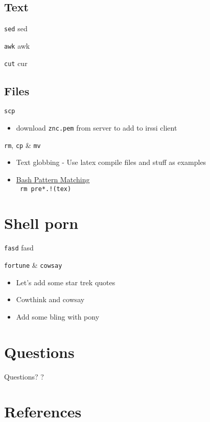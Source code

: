 \documentclass[11pt]{beamer}
\begin{document}
		\subsection{Text}
			\begin{frame}{ \texttt{sed}}
				sed
			\end{frame}
			\begin{frame}{ \texttt{awk}}
				awk
			\end{frame}
			\begin{frame}{ \texttt{cut}}
				cur
			\end{frame}
		\subsection{Files}
			\begin{frame}{ \texttt{scp}}
				\begin{itemize}
					\item download \texttt{znc.pem} from server to add to irssi client
				\end{itemize}			
			\end{frame}
			\begin{frame}{ \texttt{rm}, \texttt{cp} \& \texttt{mv}}
				\begin{itemize}
					\item Text globbing - Use latex compile files and stuff as examples
					\item \href{https://www.gnu.org/software/bash/manual/bashref.html#Pattern-Matching}{Bash Pattern Matching} \\
						\texttt{ rm pre*.!(tex) }
				\end{itemize}	
			\end{frame}

	\section{Shell porn}
		\begin{frame}{\texttt{fasd}}
			fasd
		\end{frame}
		\begin{frame}{\texttt{fortune} \& \texttt{cowsay}}
			\begin{itemize}
				\item Let's add some star trek quotes
				\item Cowthink and cowsay
				\item Add some bling with pony
			\end{itemize}
		\end{frame}

	\section{Questions}
		\begin{frame}{Questions?}
			\large ?
		\end{frame}

	\section*{References}
		\begin{frame}{References}
			\texttt{\}
		\end{frame}
\end{document}
